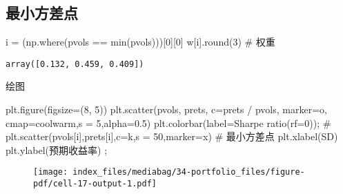\documentclass[
  letterpaper,
  DIV=11,
  numbers=noendperiod]{scrreprt}
\newenvironment{Shaded}{\begin{snugshade}}{\end{snugshade}}
\newcommand{\BuiltInTok}[1]{\textcolor[rgb]{0.00,0.23,0.31}{#1}}
\newcommand{\CommentTok}[1]{\textcolor[rgb]{0.37,0.37,0.37}{#1}}
\newcommand{\DecValTok}[1]{\textcolor[rgb]{0.68,0.00,0.00}{#1}}
\newcommand{\FloatTok}[1]{\textcolor[rgb]{0.68,0.00,0.00}{#1}}
\newcommand{\NormalTok}[1]{\textcolor[rgb]{0.00,0.23,0.31}{#1}}
\newcommand{\OperatorTok}[1]{\textcolor[rgb]{0.37,0.37,0.37}{#1}}
\newcommand{\StringTok}[1]{\textcolor[rgb]{0.13,0.47,0.30}{#1}}
\begin{document}
\hypertarget{ux6700ux5c0fux65b9ux5deeux70b9}{%
\subsection{最小方差点}\label{ux6700ux5c0fux65b9ux5deeux70b9}}

\begin{Shaded}
\begin{Highlighting}[]
\NormalTok{i }\OperatorTok{=}\NormalTok{ (np.where(pvols }\OperatorTok{==} \BuiltInTok{min}\NormalTok{(pvols)))[}\DecValTok{0}\NormalTok{][}\DecValTok{0}\NormalTok{]}
\NormalTok{w[i].}\BuiltInTok{round}\NormalTok{(}\DecValTok{3}\NormalTok{) }\CommentTok{\# 权重}
\end{Highlighting}
\end{Shaded}

\begin{verbatim}
array([0.132, 0.459, 0.409])
\end{verbatim}

绘图

\begin{Shaded}
\begin{Highlighting}[]
\NormalTok{plt.figure(figsize}\OperatorTok{=}\NormalTok{(}\DecValTok{8}\NormalTok{, }\DecValTok{5}\NormalTok{)) }
\NormalTok{plt.scatter(pvols, prets, c}\OperatorTok{=}\NormalTok{prets }\OperatorTok{/}\NormalTok{ pvols, }
\NormalTok{            marker}\OperatorTok{=}\StringTok{\textquotesingle{}o\textquotesingle{}}\NormalTok{, cmap}\OperatorTok{=}\StringTok{\textquotesingle{}coolwarm\textquotesingle{}}\NormalTok{,s }\OperatorTok{=} \DecValTok{5}\NormalTok{,alpha}\OperatorTok{=}\FloatTok{0.5}\NormalTok{) }
\NormalTok{plt.colorbar(label}\OperatorTok{=}\StringTok{\textquotesingle{}Sharpe ratio(rf=0)\textquotesingle{}}\NormalTok{)}\OperatorTok{;}  \CommentTok{\# }
\NormalTok{plt.scatter(pvols[i],prets[i],c}\OperatorTok{=}\StringTok{\textquotesingle{}k\textquotesingle{}}\NormalTok{,s }\OperatorTok{=} \DecValTok{50}\NormalTok{,marker}\OperatorTok{=}\StringTok{\textquotesingle{}x\textquotesingle{}}\NormalTok{) }\CommentTok{\# 最小方差点}
\NormalTok{plt.xlabel(}\StringTok{\textquotesingle{}SD\textquotesingle{}}\NormalTok{) }
\NormalTok{plt.ylabel(}\StringTok{\textquotesingle{}预期收益率\textquotesingle{}}\NormalTok{) }\OperatorTok{;}
\end{Highlighting}
\end{Shaded}

\begin{figure}[H]

{\centering \texttt{[image: index\_files/mediabag/34-portfolio\_files/figure-pdf/cell-17-output-1.pdf]}

}

\end{figure}
\end{document}

